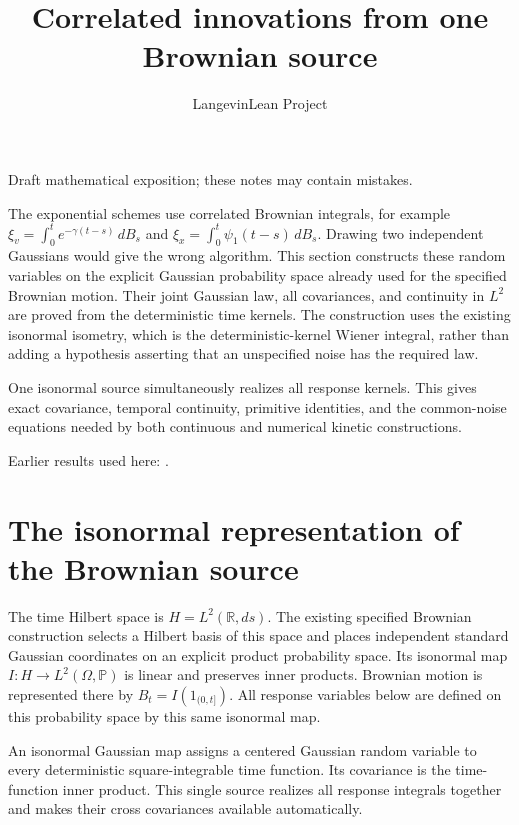 \documentclass[11pt,a4paper]{article}
\title{\texorpdfstring{Correlated innovations from one Brownian source}{Correlated innovations from one Brownian source}}
\author{LangevinLean Project}
\date{}
\begin{document}
\maketitle
Draft mathematical exposition; these notes may contain mistakes.


The exponential schemes use correlated Brownian integrals, for example \(\xi_v=\int_0^t e^{-\gamma(t-s)}\,dB_s\) and \(\xi_x=\int_0^t\psi_1(t-s)\,dB_s\). Drawing two independent Gaussians would give the wrong algorithm. This section constructs these random variables on the explicit Gaussian probability space already used for the specified Brownian motion. Their joint Gaussian law, all covariances, and continuity in \(L^{2}\) are proved from the deterministic time kernels. The construction uses the existing isonormal isometry, which is the deterministic-kernel Wiener integral, rather than adding a hypothesis asserting that an unspecified noise has the required law.



One isonormal source simultaneously realizes all response kernels. This gives exact covariance, temporal continuity, primitive identities, and the common-noise equations needed by both continuous and numerical kinetic constructions.



Earlier results used here: \cite[Section~3.8]{LangevinLean2026ULASC}.

\section{\texorpdfstring{The isonormal representation of the Brownian source}{The isonormal representation of the Brownian source}}


The time Hilbert space is \(H=L^2(\mathbb R,ds)\). The existing specified Brownian construction selects a Hilbert basis of this space and places independent standard Gaussian coordinates on an explicit product probability space. Its isonormal map \(I:H\to L^2(\Omega,\mathbb P)\) is linear and preserves inner products. Brownian motion is represented there by \(B_t=I(1_{(0,t]})\). All response variables below are defined on this probability space by this same isonormal map.



An isonormal Gaussian map assigns a centered Gaussian random variable to every deterministic square-integrable time function. Its covariance is the time-function inner product. This single source realizes all response integrals together and makes their cross covariances available automatically.
\end{document}
